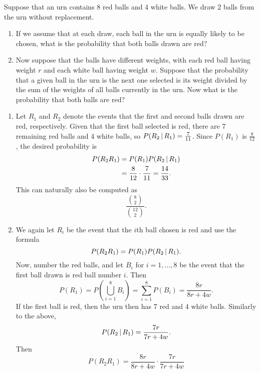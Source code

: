 \begin{changebar}
    \begin{example}
        Suppose that an urn contains 8 red balls and 4 white balls. We draw 2 balls from the urn without replacement. \begin{enumerate}[label=(\alph*)]
            \item If we assume that at each draw, each ball in the urn is equally likely to be chosen, what is the probability that both balls drawn are red?
            \item Now suppose that the balls have different weights, with each red ball having weight $r$ and each white ball having weight $w$. Suppose that the probability that a given ball in the urn is the next one selected is its weight divided by the sum of the weights of all balls currently in the urn. Now what is the probability that both balls are red?
        \end{enumerate}
    \end{example}
    \begin{solution}\hfill
        \begin{enumerate}[label=(\alph*)]
            \item Let $R_1$ and $R_2$ denote the events that the first and second balls drawn are red, respectively. Given that the first ball selected is red, there are 7 remaining red balls and 4 white balls, so $P(R_2 \,\vert\, R_1) = \frac{7}{11}$. Since $P(R_1)$ is $\frac{8}{12}$, the desired probability is \[
                \begin{aligned}
                    P(R_2R_1) &= P(R_1)P(R_2\,\vert\, R_1) \\
                    &= \frac{8}{12}\cdot\frac{7}{11} = \frac{14}{33}.
                \end{aligned}    
            \] This can naturally also be computed as \[
                \frac{{8 \choose 2}}{{12 \choose 2}}.    
            \]
            \item We again let $R_i$ be the event that the $i$th ball chosen is red and use the formula \[
                P(R_2R_1) = P(R_1)P(R_2\,\vert\, R_1).    
            \] Now, number the red balls, and let $B_i$ for $i = 1, \dots, 8$ be the event that the first ball drawn is red ball number $i$. Then \[
                P(R_1) = P\left( \bigcup^8_{i=1} B_i \right) = \sum^8_{i=1} P(B_i) = \frac{8r}{8r+4w}.    
            \] If the first ball is red, then the urn then has 7 red and 4 white balls. Similarly to the above, \[
                P(R_2 \,\vert\, R_1) = \frac{7r}{7r+4w}.
            \] Then \[
                P(R_2R_1) = \frac{8r}{8r+4w}\cdot\frac{7r}{7r+4w}    
            \]
        \end{enumerate}
    \end{solution}
\end{changebar}

